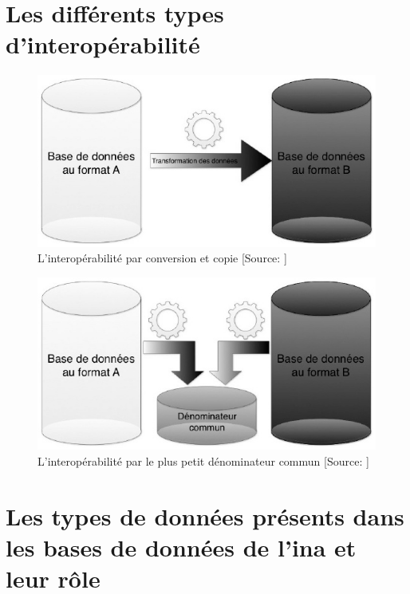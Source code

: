 \chapter{\label{annexe_types_interop}Les différents types d'interopérabilité}

\begin{figure}[!h]
	\centering
	\includegraphics[width=12cm]{images/interop_conversion_copie.jpeg}
	\medskip
	\caption[L'interopérabilité par conversion et copie]{L'interopérabilité par conversion et copie [Source: \cite{bermes_2_2013}]}
\end{figure}

\begin{figure}[!h]
	\centering
	\includegraphics[width=12cm]{images/interop_denom_commun.jpeg}
	\medskip
	\caption[L'interopérabilité par le plus petit dénominateur commun]{L'interopérabilité par le plus petit dénominateur commun [Source: \cite{bermes_2_2013}]}
\end{figure}

\chapter{\label{annexe_type_donnees_axel}Les types de données présents dans les bases de données de l'\ac{ina} et leur rôle}

